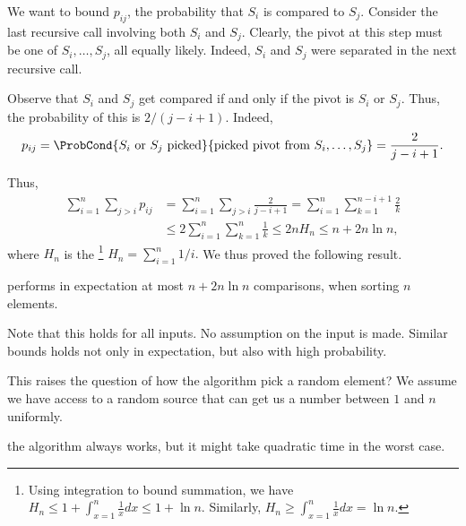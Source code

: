 We want to bound $p_{ij}$, the probability that $S_i$ is compared to
$S_j$.  Consider the last recursive call involving both $S_i$ and
$S_j$. Clearly, the pivot at this step must be one of $S_i,\ldots,S_j$, all
equally likely. Indeed, $S_i$ and $S_j$ were separated in the next
recursive call.

Observe that $S_i$ and $S_j$ get compared if and only if the pivot is
$S_i$ or $S_j$. Thus, the probability of this is $2/(j-i+1)$. Indeed,
\begin{align*}
  p_{ij}%
  =%
  \ProbCond{S_i\text{ or }S_j \text{ picked}}%
  { \text{picked pivot from } S_i,\ldots, S_j}%
  =%
  \frac{2}{j-i+1}.
\end{align*}

Thus,
\begin{align*}
    \sum_{i=1}^n \sum_{j>i} p_{ij}
    &= \sum_{i=1}^n \sum_{j>i} \frac{2}{j-i+1}
    = \sum_{i=1}^n \sum_{k=1}^{n-i+1} \frac{2}{k} \\
    &\le 2\sum_{i=1}^n \sum_{k=1}^{n} \frac{1}{k}
    \le 2 n H_n \le n + 2n \ln n ,
\end{align*}
where $H_n$ is the \footnote{Using integration
   to bound summation, we have $H_n \leq 1 + \int_{x=1}^{n}
   \frac{1}{x} dx \leq 1 + \ln n$.  Similarly, $H_n \geq
   \int_{x=1}^{n} \frac{1}{x} dx = \ln n$.}
\begin{math}
    H_n = \sum_{i=1}^n {1}/{i}.
\end{math}
We thus proved the following result.

\begin{lemma}
    \QuickSort{} performs in expectation at most $n + 2n \ln n$
    comparisons, when sorting $n$ elements.
\end{lemma}

Note that this holds for all inputs. No assumption on the input is
made. Similar bounds holds not only in expectation, but also with high
probability.

This raises the question of how the algorithm pick a random element?  We
assume we have access to a random source that can get us a number between
$1$ and $n$ uniformly.

 the algorithm always works, but it might take quadratic
time in the worst case.


